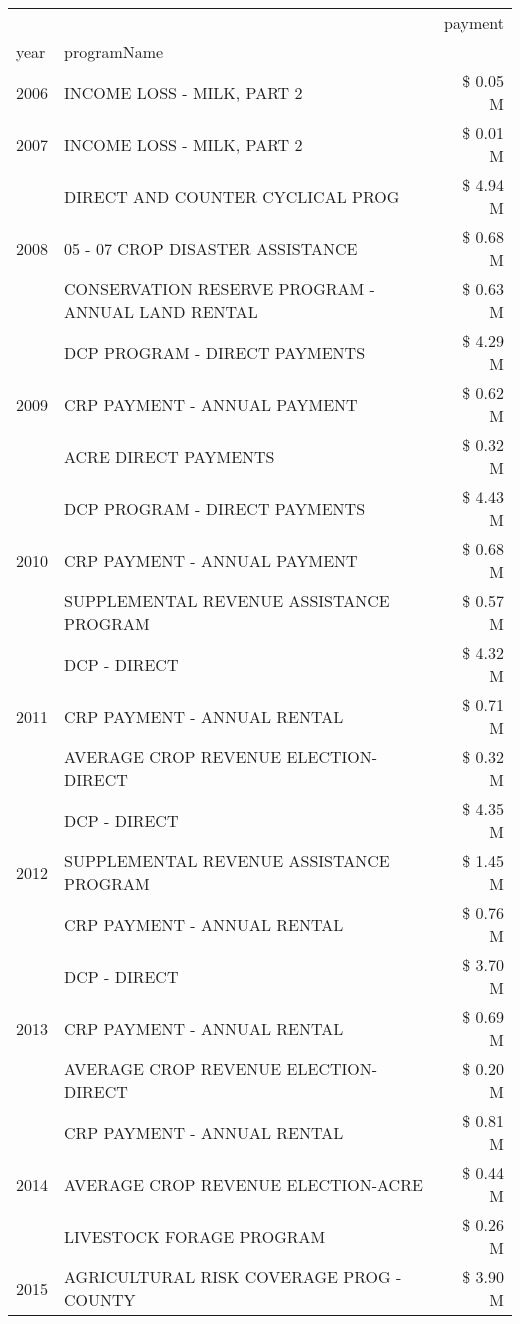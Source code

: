 \begin{tabular}{llr}
\toprule
 &  & payment \\
year & programName &  \\
\midrule
2006 & INCOME LOSS - MILK, PART 2 & \$ 0.05 M \\
\cline{1-3}
2007 & INCOME LOSS - MILK, PART 2 & \$ 0.01 M \\
\cline{1-3}
\multirow[t]{3}{*}{2008} & DIRECT AND COUNTER CYCLICAL PROG & \$ 4.94 M \\
 & 05 - 07 CROP DISASTER ASSISTANCE & \$ 0.68 M \\
 & CONSERVATION RESERVE PROGRAM - ANNUAL LAND RENTAL & \$ 0.63 M \\
\cline{1-3}
\multirow[t]{3}{*}{2009} & DCP PROGRAM - DIRECT PAYMENTS & \$ 4.29 M \\
 & CRP PAYMENT - ANNUAL PAYMENT & \$ 0.62 M \\
 & ACRE DIRECT PAYMENTS & \$ 0.32 M \\
\cline{1-3}
\multirow[t]{3}{*}{2010} & DCP PROGRAM - DIRECT PAYMENTS & \$ 4.43 M \\
 & CRP PAYMENT - ANNUAL PAYMENT & \$ 0.68 M \\
 & SUPPLEMENTAL REVENUE ASSISTANCE PROGRAM & \$ 0.57 M \\
\cline{1-3}
\multirow[t]{3}{*}{2011} & DCP - DIRECT & \$ 4.32 M \\
 & CRP PAYMENT - ANNUAL RENTAL & \$ 0.71 M \\
 & AVERAGE CROP REVENUE ELECTION-DIRECT & \$ 0.32 M \\
\cline{1-3}
\multirow[t]{3}{*}{2012} & DCP - DIRECT & \$ 4.35 M \\
 & SUPPLEMENTAL REVENUE ASSISTANCE PROGRAM & \$ 1.45 M \\
 & CRP PAYMENT - ANNUAL RENTAL & \$ 0.76 M \\
\cline{1-3}
\multirow[t]{3}{*}{2013} & DCP - DIRECT & \$ 3.70 M \\
 & CRP PAYMENT - ANNUAL RENTAL & \$ 0.69 M \\
 & AVERAGE CROP REVENUE ELECTION-DIRECT & \$ 0.20 M \\
\cline{1-3}
\multirow[t]{3}{*}{2014} & CRP PAYMENT - ANNUAL RENTAL & \$ 0.81 M \\
 & AVERAGE CROP REVENUE ELECTION-ACRE & \$ 0.44 M \\
 & LIVESTOCK FORAGE PROGRAM & \$ 0.26 M \\
\cline{1-3}
\multirow[t]{3}{*}{2015} & AGRICULTURAL RISK COVERAGE PROG - COUNTY & \$ 3.90 M \\

\end{tabular}
